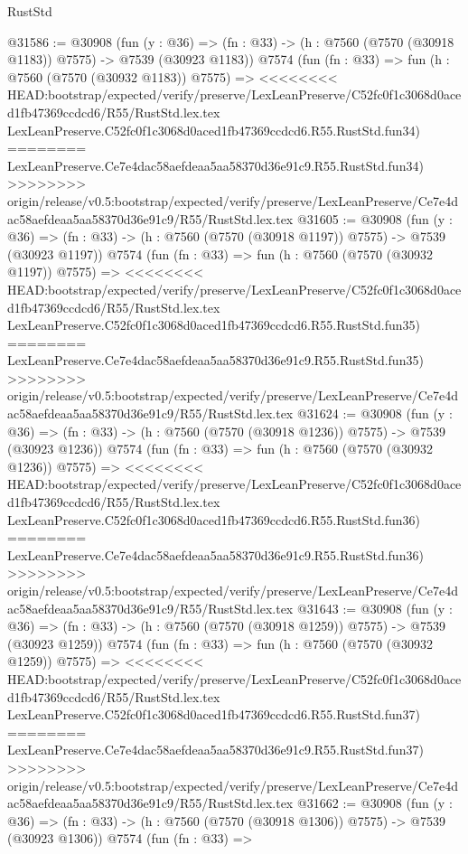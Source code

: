 \begin{lexlean}{RustStd}
\begin{coremodule}
{\begin{coremodule}
{{{{{{{{{{{{{{{{{{{{{{{{{{{{{{{{{{{{{{{{{{{@31586 := @30908
    (fun (y : @36) =>
    (fn : @33) -> (h : @7560 (@7570 (@30918 @1183)) @7575) -> @7539 (@30923 @1183))
    @7574
    (fun (fn : @33) =>
    fun (h : @7560 (@7570 (@30932 @1183)) @7575) =>
<<<<<<<< HEAD:bootstrap/expected/verify/preserve/LexLeanPreserve/C52fc0f1c3068d0aced1fb47369ccdcd6/R55/RustStd.lex.tex
    LexLeanPreserve.C52fc0f1c3068d0aced1fb47369ccdcd6.R55.RustStd.fun34)
========
    LexLeanPreserve.Ce7e4dac58aefdeaa5aa58370d36e91c9.R55.RustStd.fun34)
>>>>>>>> origin/release/v0.5:bootstrap/expected/verify/preserve/LexLeanPreserve/Ce7e4dac58aefdeaa5aa58370d36e91c9/R55/RustStd.lex.tex
@31605 := @30908
    (fun (y : @36) =>
    (fn : @33) -> (h : @7560 (@7570 (@30918 @1197)) @7575) -> @7539 (@30923 @1197))
    @7574
    (fun (fn : @33) =>
    fun (h : @7560 (@7570 (@30932 @1197)) @7575) =>
<<<<<<<< HEAD:bootstrap/expected/verify/preserve/LexLeanPreserve/C52fc0f1c3068d0aced1fb47369ccdcd6/R55/RustStd.lex.tex
    LexLeanPreserve.C52fc0f1c3068d0aced1fb47369ccdcd6.R55.RustStd.fun35)
========
    LexLeanPreserve.Ce7e4dac58aefdeaa5aa58370d36e91c9.R55.RustStd.fun35)
>>>>>>>> origin/release/v0.5:bootstrap/expected/verify/preserve/LexLeanPreserve/Ce7e4dac58aefdeaa5aa58370d36e91c9/R55/RustStd.lex.tex
@31624 := @30908
    (fun (y : @36) =>
    (fn : @33) -> (h : @7560 (@7570 (@30918 @1236)) @7575) -> @7539 (@30923 @1236))
    @7574
    (fun (fn : @33) =>
    fun (h : @7560 (@7570 (@30932 @1236)) @7575) =>
<<<<<<<< HEAD:bootstrap/expected/verify/preserve/LexLeanPreserve/C52fc0f1c3068d0aced1fb47369ccdcd6/R55/RustStd.lex.tex
    LexLeanPreserve.C52fc0f1c3068d0aced1fb47369ccdcd6.R55.RustStd.fun36)
========
    LexLeanPreserve.Ce7e4dac58aefdeaa5aa58370d36e91c9.R55.RustStd.fun36)
>>>>>>>> origin/release/v0.5:bootstrap/expected/verify/preserve/LexLeanPreserve/Ce7e4dac58aefdeaa5aa58370d36e91c9/R55/RustStd.lex.tex
@31643 := @30908
    (fun (y : @36) =>
    (fn : @33) -> (h : @7560 (@7570 (@30918 @1259)) @7575) -> @7539 (@30923 @1259))
    @7574
    (fun (fn : @33) =>
    fun (h : @7560 (@7570 (@30932 @1259)) @7575) =>
<<<<<<<< HEAD:bootstrap/expected/verify/preserve/LexLeanPreserve/C52fc0f1c3068d0aced1fb47369ccdcd6/R55/RustStd.lex.tex
    LexLeanPreserve.C52fc0f1c3068d0aced1fb47369ccdcd6.R55.RustStd.fun37)
========
    LexLeanPreserve.Ce7e4dac58aefdeaa5aa58370d36e91c9.R55.RustStd.fun37)
>>>>>>>> origin/release/v0.5:bootstrap/expected/verify/preserve/LexLeanPreserve/Ce7e4dac58aefdeaa5aa58370d36e91c9/R55/RustStd.lex.tex
@31662 := @30908
    (fun (y : @36) =>
    (fn : @33) -> (h : @7560 (@7570 (@30918 @1306)) @7575) -> @7539 (@30923 @1306))
    @7574
    (fun (fn : @33) =>
}}}}}}}}}}}}}}}}}}}}}}}}}}}}}}}}}}}}}}}}}}}
\end{coremodule}}
\end{coremodule}
\end{lexlean}
